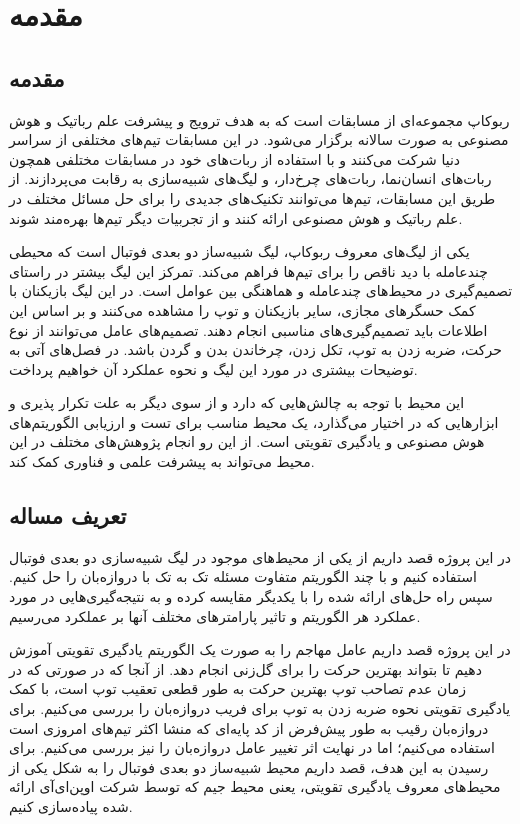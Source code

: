 \chapter{مقدمه}
\section{مقدمه}
ربوکاپ
 مجموعه‌ای از مسابقات است که به هدف ترویج و پیشرفت علم رباتیک و هوش مصنوعی به صورت سالانه برگزار می‌شود.
در این مسابقات تیم‌های مختلفی از سراسر دنیا شرکت می‌کنند و با استفاده از ربات‌های خود در مسابقات مختلفی همچون ربات‌های انسان‌نما، ربات‌های چرخ‌دار، و لیگ‌های شبیه‌سازی به رقابت می‌پردازند.
از طریق این مسابقات، تیم‌ها می‌توانند تکنیک‌های جدیدی را برای حل مسائل مختلف در علم رباتیک و هوش مصنوعی ارائه کنند و از تجربیات دیگر تیم‌ها بهره‌مند شوند.

یکی از لیگ‌های معروف ربوکاپ،‌ لیگ شبیه‌ساز دو بعدی فوتبال است
که محیطی چندعامله با دید ناقص
 را برای تیم‌ها فراهم می‌کند.
تمرکز این لیگ بیشتر در راستای تصمیم‌گیری در محیط‌های چندعامله و هماهنگی بین عوامل است.
در این لیگ بازیکنان با کمک حسگر‌های مجازی، سایر بازیکنان و توپ را مشاهده می‌کنند و بر اساس این اطلاعات باید تصمیم‌گیری‌های مناسبی انجام دهند.
تصمیم‌های عامل می‌توانند از نوع حرکت، ضربه زدن به توپ، تکل زدن، چرخاندن بدن و گردن باشد.
در فصل‌های آتی به توضیحات بیشتری در مورد این لیگ و نحوه عملکرد آن خواهیم پرداخت.

این محیط با توجه به چالش‌هایی که دارد و از سوی دیگر به علت تکرار پذیری و ابزار‌هایی که در اختیار می‌گذارد، یک محیط مناسب برای تست و ارزیابی الگوریتم‌های هوش مصنوعی و یادگیری تقویتی است.
از این رو انجام پژوهش‌های مختلف در این محیط می‌تواند به پیشرفت علمی و فناوری کمک کند.
\section{تعریف مساله}
در این پروژه قصد داریم از یکی از محیط‌های موجود در لیگ شبیه‌سازی دو بعدی فوتبال استفاده کنیم و با چند الگوریتم متفاوت 
مسئله تک به تک با دروازه‌بان را حل کنیم.
سپس راه حل‌های ارائه شده را با یکدیگر مقایسه کرده و به نتیجه‌گیری‌هایی در مورد عملکرد هر الگوریتم و تاثیر پارامتر‌های مختلف آنها بر عملکرد می‌رسیم.

در این پروژه قصد داریم عامل مهاجم را به صورت یک الگوریتم یادگیری تقویتی آموزش دهیم تا بتواند بهترین حرکت را برای گل‌زنی انجام دهد.
از آنجا که در صورتی که در زمان عدم تصاحب توپ بهترین حرکت به طور قطعی تعقیب توپ است، با کمک یادگیری تقویتی نحوه ضربه زدن به توپ برای فریب دروازه‌بان را بررسی می‌کنیم.
برای دروازه‌بان رقیب به طور پیش‌فرض از کد پایه‌ای که منشا اکثر تیم‌های امروزی است استفاده می‌کنیم؛ اما در نهایت اثر تغییر عامل دروازه‌بان را نیز بررسی می‌کنیم.
برای رسیدن به این هدف، قصد داریم محیط شبیه‌ساز دو بعدی فوتبال را به شکل یکی از محیط‌های معروف یادگیری تقویتی، یعنی محیط جیم
که توسط شرکت اوپن‌ای‌آی ارائه شده پیاده‌سازی کنیم.
